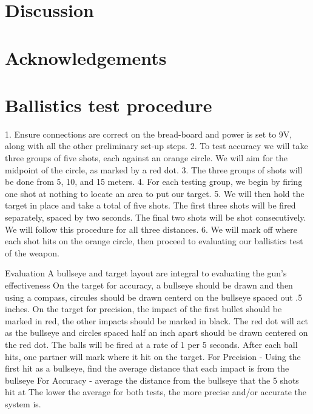 \documentclass{article}
\begin{document}
\section{Discussion}
\section{Acknowledgements}


%



\appendix
\section{Ballistics test procedure}
\label{app:A}
1. Ensure connections are correct on the bread-board and power is set to 9V, along with all the other preliminary set-up steps.
2. To test accuracy we will take three groups of five shots, each against an orange circle. We will aim for the midpoint of the circle, as marked by a red dot.
3. The three groups of shots will be done from 5, 10, and 15 meters.
4. For each testing group, we begin by firing one shot at nothing to locate an area to put our target.
5. We will then hold the target in place and take a total of five shots. The first three shots will be fired separately, spaced by two seconds. The final two shots will be shot consecutively. We will follow this procedure for all three distances. 
6. We will mark off where each shot hits on the orange circle, then proceed to evaluating our ballistics test of the weapon.
 
Evaluation
A bullseye and target layout are integral to evaluating the gun’s effectiveness
On the target for accuracy, a bullseye should be drawn and then using a compass, circules should be drawn centerd on the bullseye spaced out .5 inches.
On the target for precision, the impact of the first bullet should be marked in red, the other impacts should be marked in black. The red dot will act as the bullseye and circles spaced half an inch apart should be drawn centered on the red dot.
The balls will be fired at a rate of 1 per 5 seconds. After each ball hits, one partner will mark where it hit on the target. 
For Precision - Using the first hit as a bullseye, find the average distance that each impact is from the bullseye
For Accuracy - average the distance from the bullseye that the 5 shots hit at
The lower the average for both tests, the more precise and/or accurate the system is.
\end{document}
